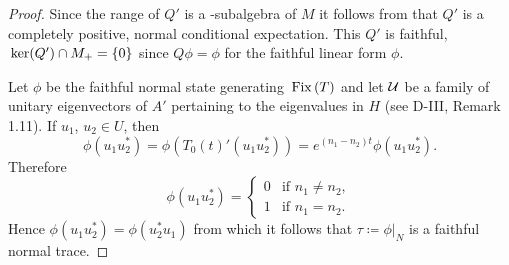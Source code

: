 \begin{proof}
Since the range of $Q'$ is a \WA-subalgebra of $M$ it follows from \citet[Theorem III.3.4]{takesaki:1979} that $Q'$ is a completely positive, normal conditional expectation.
This $Q'$ is faithful, \ie $\mathop{}\mathrm{ker}(Q') \cap M_{+} = \{0\}$ since $Q\phi = \phi$ for the faithful linear form $\phi$.

Let $\phi$ be the faithful normal state generating $\mathop{}\mathrm{Fix}\left(T\right)$ and let $\mathcal{U}$ be a family of unitary eigenvectors of $A'$ pertaining to the eigenvalues in $H$ (see D-III, Remark 1.11).
If $u_{1}$, $u_{2} \in U$, then
\[
\phi(u_{1}u_{2}^{*}) = \phi(T_{0}(t)'(u_{1}u_{2}^{*})) = e^{(n_{1}-n_{2})t}\phi(u_{1}u_{2}^{*}).
\]
Therefore
\[
\phi(u_{1}u_{2}^{*}) = \begin{cases} 0 & \text{if } n_{1} \neq n_{2}, \\ 1 & \text{if } n_{1} = n_{2}. \end{cases}
\]
Hence $\phi(u_{1}u_{2}^{*}) = \phi(u_{2}^{*}u_{1})$ from which it follows that $\tau \coloneqq \phi|_{N}$ is a faithful normal trace.
\end{proof}
